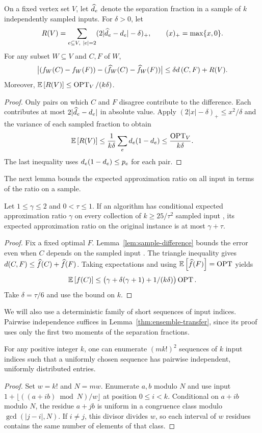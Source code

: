 \begin{lemma}\label{lem:sample-difference}
On a fixed vertex set $V$, let $\estweight{e}$ denote the separation
fraction in a sample of $k$ independently sampled inputs. For $\delta>0$,
let
\[
 R(V)=\sum_{e\subseteq V,\ |e|=2}(2|\estweight{e}-\weight{e}|-\delta)_+,
 \qquad (x)_+=\max\{x,0\}.
\]
For any subset $W\subseteq V$ and \clusterings $C,F$ of $W$,
\[
 \big|(f_W(C)-f_W(F))-(\widehat {f}_W(C)-\widehat {f}_W(F))\big|
 \le \delta d\left(C,F\right)+R(V).
\]
Moreover, $\expt{R(V)}\le\operatorname{OPT}_V/(k\delta)$.
\end{lemma}
\begin{proof}
Only pairs on which $C$ and $F$ disagree contribute to the difference.
Each contributes at most $2|\estweight{e}-\weight{e}|$ in absolute value.
Apply $(2|x|-\delta)_+\le x^2/\delta$ and the variance of each sampled
fraction to obtain
\[
 \expt{R(V)}\le\frac{1}{k\delta}\sum_e \weight{e}(1-\weight{e})
 \le\frac{\operatorname{OPT}_V}{k\delta}.
\]
The last inequality uses $\weight{e}(1-\weight{e})\le \mweight{e}$ for each pair.
\end{proof}

The next lemma bounds the expected approximation ratio on all input
\clusterings in terms of the ratio on a sample.

\begin{lemma}\label{thm:ensemble-transfer}
Let $1\le\gamma\le2$ and $0<\tau\le1$. If an algorithm has conditional
expected approximation ratio $\gamma$ on every collection of
$k\ge25/\tau^2$ sampled input \clusterings, its expected approximation ratio on the original instance
is at most $\gamma+\tau$.
\end{lemma}
\begin{proof}
Fix a fixed optimal \clustering $F$. Lemma~\ref{lem:sample-difference} bounds the
error even when $C$ depends on the sampled input \clusterings. The \clustering triangle
inequality gives $d(C,F)\le\widehat {f}(C)+\widehat {f}(F)$.
Taking expectations and using $\expt{\estcost(F)}=\operatorname{OPT}$
yields
\[
 \expt{\cost(C)}\le
 \bigl(\gamma+\delta(\gamma+1)+1/(k\delta)\bigr)\operatorname{OPT}.
\]
Take $\delta=\tau/6$ and use the bound on $k$.
\end{proof}

We will also use a deterministic family of short sequences of input indices. Pairwise
independence suffices in Lemma~\ref{thm:ensemble-transfer}, since its
proof uses only the first two moments of the separation fractions.

\begin{lemma}\label{lem:finite-lists}
For any positive integer $k$, one can enumerate $(m k!)^2$ sequences of
$k$ input indices such that a uniformly chosen sequence has pairwise
independent, uniformly distributed entries.
\end{lemma}
\begin{proof}
Set $w=k!$ and $N=mw$. Enumerate $a,b$ modulo $N$ and use input
$1+\lfloor((a+ib)\bmod N)/w\rfloor$ at position $0\le i<k$.
Conditional on $a+ib$ modulo $N$, the residue $a+jb$ is uniform
in a congruence class modulo $\gcd(|j-i|,N)$. If $i\ne j$, this
divisor divides $w$, so each interval of $w$ residues contains the
same number of elements of that class.
\end{proof}

